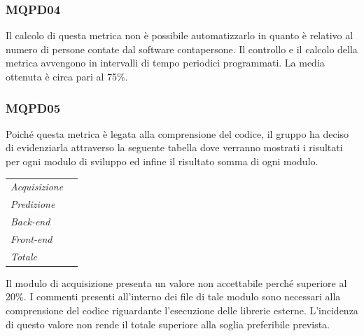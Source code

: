 {{{{{{{{{\subsubsection{MQPD04}\label{ResocontoAttivitàDiVerificaRevisioneDiQualificaVerificheDiProcessoMQPD04}

Il calcolo di questa metrica non è possibile automatizzarlo in quanto è relativo al numero di persone contate dal software contapersone. Il controllo e il calcolo della metrica avvengono in intervalli di tempo periodici programmati. La media ottenuta è circa pari al 75\%.

\subsubsection{MQPD05}\label{ResocontoAttivitàDiVerificaRevisioneDiQualificaVerificheDiProcessoMQPD05}

Poiché questa metrica è legata alla comprensione del codice, il gruppo ha deciso di evidenziarla attraverso la seguente tabella dove verranno mostrati i risultati per ogni modulo di sviluppo ed infine il risultato somma di ogni modulo.

\quad
\def\tabularxcolumn#1{m{#1}}
{
	\begin{center}
	\renewcommand{\arraystretch}{1.4}
	\begin{longtable}[c]{|p{4cm}|p{4cm}|}
			\hline
			\rowcolor{airforceblue}
			\makecell[c]{\textbf{Modulo}} & \makecell[c]{\textbf{Valore metrica}}\\
			\hline
			\textit{Acquisizione} & \makecell[c]{27\%} \\
			\hline
			\textit{Predizione} & \makecell[c]{18\%}\\
			\hline
			\textit{Back-end} &  \makecell[c]{11\%}\\
			\hline
			\textit{Front-end} & \makecell[c]{0,2\%} \\
			\hline
			\textit{Totale} & \makecell[c]{8\%}\\
			\hline
		\end{longtable}
	\end{center}

Il modulo di acquisizione presenta un valore non accettabile perché superiore al 20\%. I commenti presenti all'interno dei file di tale modulo sono necessari alla comprensione del codice riguardante l'esecuzione delle librerie esterne. L'incidenza di questo valore non rende il totale superiore alla soglia preferibile prevista.

}}}}}}}}}}

